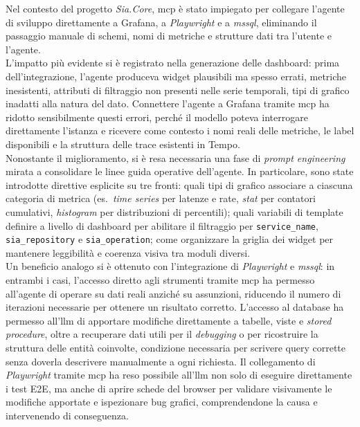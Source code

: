 Nel contesto del progetto \emph{Sia.Core}, \gls{mcp} è stato impiegato per collegare l'agente
di sviluppo direttamente a Grafana, a \emph{Playwright} e a \emph{mssql}, eliminando il
passaggio manuale di schemi, nomi di metriche e strutture dati tra l'utente e l'agente.\\
L'impatto più evidente si è registrato nella generazione delle dashboard: prima
dell'integrazione, l'agente produceva widget plausibili ma spesso errati, metriche
inesistenti, attributi di filtraggio non presenti nelle serie temporali, tipi di grafico
inadatti alla natura del dato. Connettere l'agente a Grafana tramite \gls{mcp} ha ridotto
sensibilmente questi errori, perché il modello poteva interrogare direttamente l'istanza
e ricevere come contesto i nomi reali delle metriche, le label disponibili e la struttura
delle trace esistenti in Tempo.\\
Nonostante il miglioramento, si è resa necessaria una fase di \emph{prompt engineering}
mirata a consolidare le linee guida operative dell'agente. In particolare, sono state
introdotte direttive esplicite su tre fronti: quali tipi di grafico associare a ciascuna
categoria di metrica (es.\ \emph{time series} per latenze e rate, \emph{stat} per
contatori cumulativi, \emph{histogram} per distribuzioni di percentili); quali variabili
di template definire a livello di dashboard per abilitare il filtraggio per
\texttt{service\_name}, \texttt{sia\_repository} e \texttt{sia\_operation}; come
organizzare la griglia dei widget per mantenere leggibilità e coerenza visiva tra moduli
diversi.\\
Un beneficio analogo si è ottenuto con l'integrazione di \emph{Playwright} e
\emph{mssql}: in entrambi i casi, l'accesso diretto agli strumenti tramite \gls{mcp} ha
permesso all'agente di operare su dati reali anziché su assunzioni, riducendo il numero
di iterazioni necessarie per ottenere un risultato corretto.
L'accesso al database ha permesso all'\gls{llm} di apportare modifiche direttamente a tabelle,
viste e \emph{stored procedure}, oltre a recuperare dati utili per il \emph{debugging} o per
ricostruire la struttura delle entità coinvolte, condizione necessaria per scrivere query
corrette senza doverla descrivere manualmente a ogni richiesta. Il collegamento di
\emph{Playwright} tramite \gls{mcp} ha reso possibile all'\gls{llm} non solo di eseguire
direttamente i test E2E, ma anche di aprire schede del browser per validare visivamente le
modifiche apportate e ispezionare bug grafici, comprendendone la causa e intervenendo di
conseguenza.

